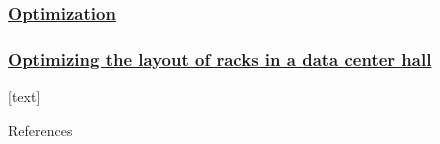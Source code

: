 \documentclass[aspectratio=169,10pt,xcolor={table,dvipsnames},t]{beamer}
\begin{document}
{    \begin{frame}
        \frametitle{\href{https://datahub.berkeley.edu/user-redirect/git-pull?repo=https://github.com/mtsn-lab/me137-237a&subPath=examples/optimizationMethodsIntroduction.ipynb}{Optimization}}

    \end{frame}


    \begin{frame}
        \frametitle{\href{https://datahub.berkeley.edu/user-redirect/git-pull?repo=https://github.com/mtsn-lab/me137-237a&subPath=examples/optimizationGeneticAlgorithmRackLayout.ipynb}{Optimizing the layout of racks in a data center hall}}

    \end{frame}

    




{
[text] %
	\begin{frame}[allowframebreaks]{References}
		
		
	\end{frame}
}

}
\end{document}

